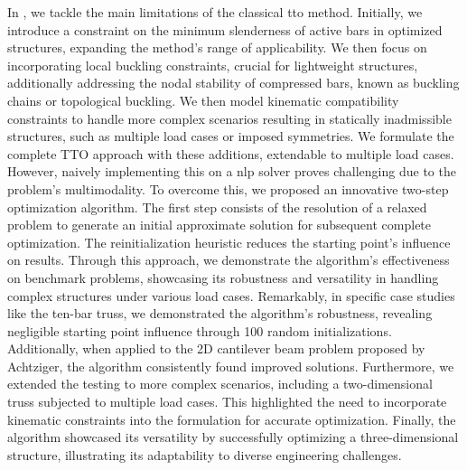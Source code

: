In , we tackle the main limitations of the classical \gls{tto} method. Initially, we introduce a constraint on the minimum slenderness of active bars in optimized structures, expanding the method's range of applicability. We then focus on incorporating local buckling constraints, crucial for lightweight structures, additionally addressing the nodal stability of compressed bars, known as buckling chains or topological buckling. We then model kinematic compatibility constraints to handle more complex scenarios resulting in statically inadmissible structures, such as multiple load cases or imposed symmetries. We formulate the complete TTO approach with these additions, extendable to multiple load cases. However, naively implementing this on a \gls{nlp} solver proves challenging due to the problem's multimodality. To overcome this, we proposed an innovative two-step optimization algorithm. The first step consists of the resolution of a relaxed problem to generate an initial approximate solution for subsequent complete optimization. The reinitialization heuristic reduces the starting point's influence on results. Through this approach, we demonstrate the algorithm's effectiveness on benchmark problems, showcasing its robustness and versatility in handling complex structures under various load cases. Remarkably, in specific case studies like the ten-bar truss, we demonstrated the algorithm's robustness, revealing negligible starting point influence through 100 random initializations. Additionally, when applied to the 2D cantilever beam problem proposed by Achtziger, the algorithm consistently found improved solutions. Furthermore, we extended the testing to more complex scenarios, including a two-dimensional truss subjected to multiple load cases. This highlighted the need to incorporate kinematic constraints into the formulation for accurate optimization. Finally, the algorithm showcased its versatility by successfully optimizing a three-dimensional structure, illustrating its adaptability to diverse engineering challenges.

